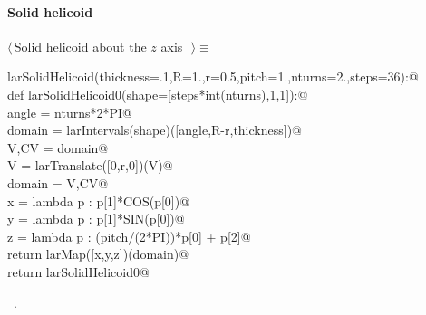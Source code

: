 \documentclass[11pt,oneside]{article}	%
\begin{document}
\paragraph{Solid helicoid}
\begin{flushleft} \small \label{scrap16}
$\langle\,$Solid helicoid about the $z$ axis\nobreak\ {\footnotesize {}}$\,\rangle\equiv$
\vspace{-1ex}
\begin{list}{}{} \item
\mbox{}\verb@def larSolidHelicoid(thickness=.1,R=1.,r=0.5,pitch=1.,nturns=2.,steps=36):@\\
\mbox{}\verb@   def larSolidHelicoid0(shape=[steps*int(nturns),1,1]):@\\
\mbox{}\verb@      angle = nturns*2*PI@\\
\mbox{}\verb@      domain = larIntervals(shape)([angle,R-r,thickness])@\\
\mbox{}\verb@      V,CV = domain@\\
\mbox{}\verb@      V = larTranslate([0,r,0])(V)@\\
\mbox{}\verb@      domain = V,CV@\\
\mbox{}\verb@      x = lambda p : p[1]*COS(p[0])@\\
\mbox{}\verb@      y = lambda p : p[1]*SIN(p[0])@\\
\mbox{}\verb@      z = lambda p : (pitch/(2*PI))*p[0] + p[2]@\\
\mbox{}\verb@      return larMap([x,y,z])(domain)@\\
\mbox{}\verb@   return larSolidHelicoid0@\\
\mbox{}\verb@@{\NWsep}
\end{list}
\vspace{-1ex}
\footnotesize\addtolength{\baselineskip}{-1ex}
\begin{list}{}{\setlength{\itemsep}{-\parsep}\setlength{\itemindent}{-\leftmargin}}
\item \NWtxtMacroRefIn\ .
\end{list}
\end{flushleft}
\end{document}
